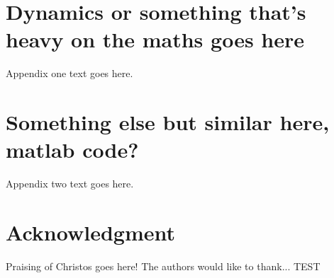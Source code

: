 \documentclass[journal]{IEEEtran}
\begin{document}
	
	
	
	
	
	\appendices
	\section{Dynamics or something that's heavy on the maths goes here}
	Appendix one text goes here.
	
	\section{Something else but similar here, matlab code?}
	Appendix two text goes here.
	
	
	\section*{Acknowledgment}
	
	Praising of Christos goes here!
	The authors would like to thank...
	TEST
	
	
	\ifCLASSOPTIONcaptionsoff
	\newpage
	\fi
	
\end{document}
